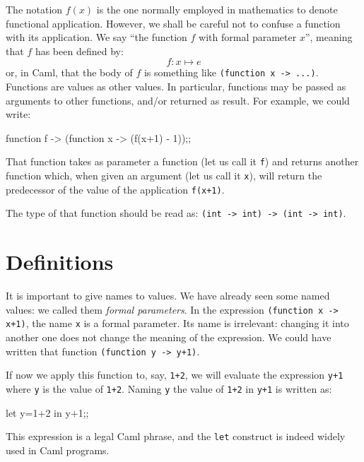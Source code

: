 The notation $f(x)$ is the one normally employed in mathematics to
denote functional application. However, we shall be careful not to
confuse a function with its application. We say ``the function $f$
with formal parameter $x$'', meaning that $f$ has been defined by:
\[f: x \mapsto e \]
or, in Caml, that the body of $f$ is something like
\verb|(function x -> ...)|.
Functions are values as other values.  In particular, functions may be
passed as arguments to other functions, and/or returned as result. For
example, we could write:
\begin{caml_example}
function f -> (function x -> (f(x+1) - 1));;
\end{caml_example}
That function takes as parameter a function (let us call it \verb|f|) and
returns another function which, when given an argument (let us call it
\verb|x|), will return the predecessor of the value of the application
\verb|f(x+1)|.

The type of that function should be read as:
\verb|(int -> int) -> (int -> int)|.


\section{Definitions}


It is important to give names to values.
We have already seen some named values: we
called them {\em formal parameters}. In the expression
\verb|(function x -> x+1)|, the name \verb|x| is a formal parameter.
Its name is irrelevant: changing it into another one
does not change the meaning of the
expression.
We could have written that function \verb|(function y -> y+1)|.

If now we apply this function to, say, \verb|1+2|, we will evaluate
the expression \verb|y+1| where \verb|y| is the value of \verb|1+2|.
Naming {\tt y} the value of \verb|1+2| in \verb|y+1| is written as:
\begin{caml_example}
let y=1+2 in y+1;;
\end{caml_example}
This expression is a legal Caml phrase, and the \verb|let|
construct is indeed widely used in Caml programs.

